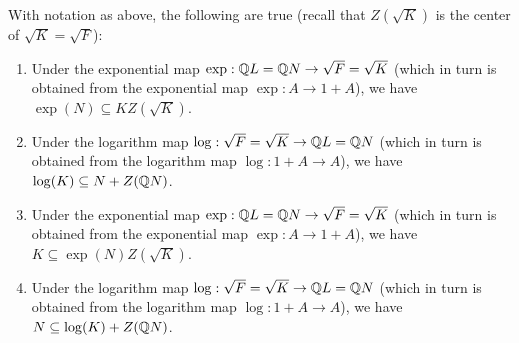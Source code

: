 \begin{lemma}\label{lemma:exp-log-error-term}
  With notation as above, the following are true (recall that
  $Z(\sqrt{K})$ is the center of $\sqrt{K} = \sqrt{F}$):

  \begin{enumerate}
  \item Under the exponential map $\exp: \mathbb{Q} L = \mathbb{Q} N \to \sqrt{F} =
    \sqrt{K}$ (which in turn is obtained from the exponential map
    $\exp:A \to 1 + A$), we have $\exp(N) \subseteq
    KZ(\sqrt{K})$. 
  \item Under the logarithm map $\log: \sqrt{F} = \sqrt{K} \to \mathbb{Q} L =
    \mathbb{Q} N$ (which in turn is obtained from the logarithm map $\log:1 +
    A \to A$), we have $\log(K) \subseteq N + Z(\mathbb{Q} N)$.
  \item Under the exponential map $\exp: \mathbb{Q} L = \mathbb{Q} N \to \sqrt{F} =
    \sqrt{K}$ (which in turn is obtained from the exponential map
    $\exp:A \to 1 + A$), we have $K \subseteq
    \exp(N)Z(\sqrt{K})$. 
  \item Under the logarithm map $\log: \sqrt{F} = \sqrt{K} \to \mathbb{Q} L =
    \mathbb{Q} N$ (which in turn is obtained from the logarithm map $\log:1 +
    A \to A$), we have $N \subseteq \log(K) + Z(\mathbb{Q} N)$.

  \end{enumerate}
\end{lemma}

